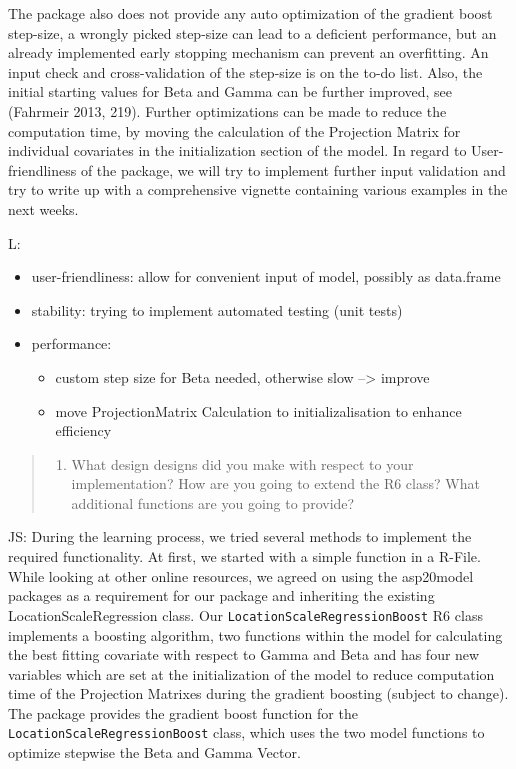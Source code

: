 \documentclass[
]{report}
\providecommand{\tightlist}{%
  \setlength{\itemsep}{0pt}\setlength{\parskip}{0pt}}
\begin{document}
The package also does not provide any auto optimization of the gradient
boost step-size, a wrongly picked step-size can lead to a deficient
performance, but an already implemented early stopping mechanism can
prevent an overfitting. An input check and cross-validation of the
step-size is on the to-do list. Also, the initial starting values for
Beta and Gamma can be further improved, see (Fahrmeir 2013, 219).
Further optimizations can be made to reduce the computation time, by
moving the calculation of the Projection Matrix for individual
covariates in the initialization section of the model. In regard to
User-friendliness of the package, we will try to implement further input
validation and try to write up with a comprehensive vignette containing
various examples in the next weeks.

L:

\begin{itemize}
\tightlist
\item
  user-friendliness: allow for convenient input of model, possibly as
  data.frame
\item
  stability: trying to implement automated testing (unit tests)
\item
  performance:

  \begin{itemize}
  \tightlist
  \item
    custom step size for Beta needed, otherwise slow --\textgreater{}
    improve
  \item
    move ProjectionMatrix Calculation to initializalisation to enhance
    efficiency
  \end{itemize}
\end{itemize}

\begin{quote}
\begin{enumerate}
\def\labelenumi{\arabic{enumi}.}
\setcounter{enumi}{1}
\tightlist
\item
  What design designs did you make with respect to your implementation?
  How are you going to extend the R6 class? What additional functions
  are you going to provide?
\end{enumerate}
\end{quote}

JS: During the learning process, we tried several methods to implement
the required functionality. At first, we started with a simple function
in a R-File. While looking at other online resources, we agreed on using
the asp20model packages as a requirement for our package and inheriting
the existing LocationScaleRegression class. Our
\texttt{LocationScaleRegressionBoost} R6 class implements a boosting
algorithm, two functions within the model for calculating the best
fitting covariate with respect to Gamma and Beta and has four new
variables which are set at the initialization of the model to reduce
computation time of the Projection Matrixes during the gradient boosting
(subject to change). The package provides the gradient boost function
for the \texttt{LocationScaleRegressionBoost} class, which uses the two
model functions to optimize stepwise the Beta and Gamma Vector.
\end{document}
